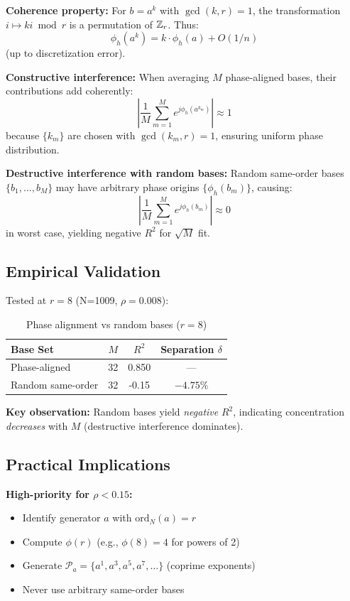 \textbf{Coherence property:} For $b = a^k$ with $\gcd(k,r)=1$, the transformation $i \mapsto ki \bmod r$ is a permutation of $\mathbb{Z}_r$. Thus:
\begin{equation}
\phi_h(a^k) = k \cdot \phi_h(a) + O(1/n)
\end{equation}
(up to discretization error).

\textbf{Constructive interference:} When averaging $M$ phase-aligned bases, their contributions add coherently:
\begin{equation}
\left|\frac{1}{M}\sum_{m=1}^M e^{j\phi_h(a^{k_m})}\right| \approx 1
\end{equation}
because $\{k_m\}$ are chosen with $\gcd(k_m, r)=1$, ensuring uniform phase distribution.

\textbf{Destructive interference with random bases:} Random same-order bases $\{b_1, \ldots, b_M\}$ may have arbitrary phase origins $\{\phi_h(b_m)\}$, causing:
\begin{equation}
\left|\frac{1}{M}\sum_{m=1}^M e^{j\phi_h(b_m)}\right| \approx 0
\end{equation}
in worst case, yielding negative $R^2$ for $\sqrt{M}$ fit.

\subsection{Empirical Validation}

Tested at $r=8$ (N=1009, $\rho=0.008$):

\begin{table}[h]
\centering
\begin{tabular}{@{}lccc@{}}
\toprule
Base Set & $M$ & $R^2$ & Separation $\delta$ \\
\midrule
Phase-aligned & 32 & 0.850 & --- \\
Random same-order & 32 & -0.15 & $-4.75\%$ \\
\bottomrule
\end{tabular}
\caption{Phase alignment vs random bases ($r=8$)}
\end{table}

\textbf{Key observation:} Random bases yield \emph{negative} $R^2$, indicating concentration \emph{decreases} with $M$ (destructive interference dominates).

\subsection{Practical Implications}

\textbf{High-priority for $\rho < 0.15$:}
\begin{itemize}
    \item Identify generator $a$ with $\text{ord}_N(a) = r$
    \item Compute $\phi(r)$ (e.g., $\phi(8) = 4$ for powers of 2)
    \item Generate $\mathcal{P}_a = \{a^1, a^3, a^5, a^7, \ldots\}$ (coprime exponents)
    \item Never use arbitrary same-order bases
\end{itemize}

